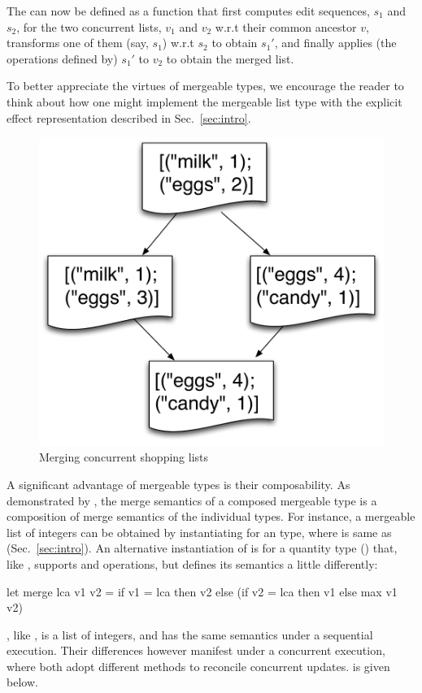 The  can now be defined as a function that first
computes edit sequences, $s_1$ and $s_2$, for the two concurrent
lists, $v_1$ and $v_2$ w.r.t their common ancestor $v$, transforms one
of them (say, $s_1$) w.r.t $s_2$ to obtain $s_1'$, and finally applies
(the operations defined by) $s_1'$ to $v_2$ to obtain the merged list.

 To better appreciate the virtues
of mergeable types, we encourage the reader to think about how one
might implement the mergeable list type with the explicit effect
representation described in Sec.~\ref{sec:intro}.

\begin{figure}
  \centering
  \includegraphics[scale=0.4]{Figures/shopping-list}

  \caption{Merging concurrent shopping lists}
  \label{fig:shopping-list}
\end{figure}

A significant advantage of mergeable types is their composability. As
demonstrated by , the merge semantics of a composed mergeable
type is a composition of merge semantics of the individual types.  For
instance, a mergeable list of integers can be obtained by
instantiating  for an  type, where  is
same as  (Sec.~\ref{sec:intro}). 
An alternative instantiation of  is for a quantity type
() that, like , supports  and 
operations, but defines its  semantics a little differently:
\begin{ocaml}
let merge lca v1 v2 = if v1 = lca then v2 else (if v2 = lca then v1 else max v1 v2)
\end{ocaml}
, like , is a list of integers, and has
the same semantics under a sequential execution. Their differences
however manifest under a concurrent execution, where both adopt
different methods to reconcile concurrent updates.  is given
below.

